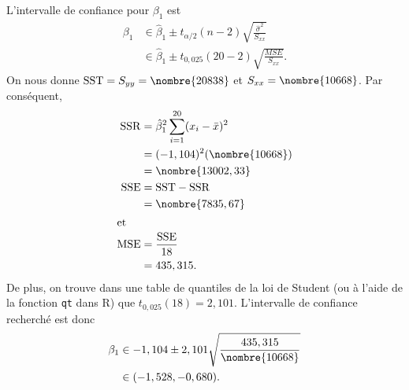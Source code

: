 \begin{solution}{2.12}
    L'intervalle de confiance pour $\beta_1$ est
    \begin{align*}
      \beta_1
      &\in \hat{\beta}_1 \pm t_{\alpha/2}(n - 2)
      \sqrt{\frac{\hat{\sigma}^2}{S_{xx}}} \\
      &\in \hat{\beta}_1 \pm t_{0,025}(20 - 2) \sqrt{\frac{MSE}{S_{xx}}}.
     \end{align*}
     On nous donne $\SST = S_{yy} = \nombre{20838}$ et $S_{xx} =
     \nombre{10668}$. Par conséquent,
     \begin{align*}
       \SSR
       &= \hat{\beta}_1^2 \sum_{i=1}^{20} (x_i - \bar{x})^2 \\
       &= (-1,104)^2(\nombre{10668}) \\
       &= \nombre{13002,33} \\
       \SSE
       &= \SST - \SSR \\
       &= \nombre{7835,67} \\
       \intertext{et}
       \MSE
       &= \frac{\SSE}{18} \\
       &= 435,315.
     \end{align*}
     De plus, on trouve dans une table de quantiles de la loi de
     Student (ou à l'aide de la fonction \texttt{qt} dans \textsf{R})
     que $t_{0,025}(18) = 2,101$. L'intervalle de confiance recherché
     est donc
     \begin{align*}
       \beta_1
       &\in -1,104 \pm 2,101 \sqrt{\frac{435,315}{\nombre{10668}}} \\
       &\in (-1,528, -0,680).
     \end{align*}
  
\end{solution}
